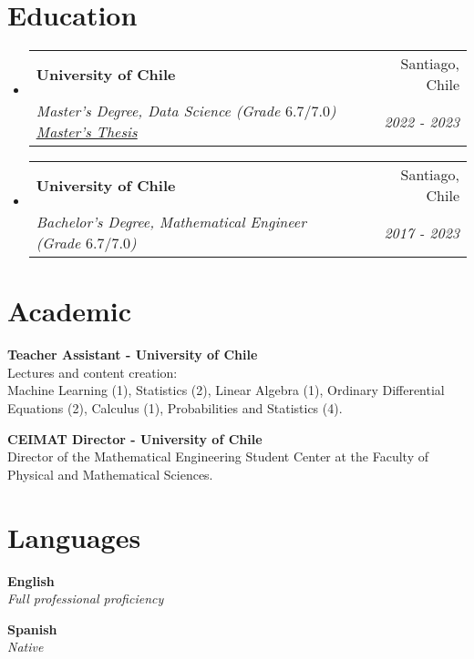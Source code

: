 \documentclass[letterpaper,11pt]{article}
\makeatletter
\newcommand{\resumeSubheading}[4]{
  \vspace{-2pt}\item
    \begin{tabular*}{0.97\textwidth}[t]{l@{\extracolsep{\fill}}r}
      \textbf{#1} & #2 \\
      \textit{\small#3} & \textit{\small #4} \\
    \end{tabular*}\vspace{-7pt}
}
\newcommand{\resumeSubHeadingListStart}{\begin{itemize}[leftmargin=0.15in, label={}]}
\newcommand{\resumeSubHeadingListEnd}{\end{itemize}}
\makeatother
\begin{document}
\section{Education}
  \resumeSubHeadingListStart
    \resumeSubheading
      {University of Chile}{Santiago, Chile}
      {Master's Degree, Data Science (Grade $6.7/7.0$) \href{https://repositorio.uchile.cl/handle/2250/197408}{\underline{Master's Thesis}}}{2022 - 2023}
    \resumeSubheading
      {University of Chile}{Santiago, Chile}
      {Bachelor's Degree, Mathematical Engineer (Grade $6.7/7.0$)}{2017 - 2023}
  \resumeSubHeadingListEnd


 \section{Academic}
  \begin{itemize}[leftmargin=0.15in, label={}]
  \small{\item{
     \textbf{Teacher Assistant - University of Chile} \\
     Lectures and content creation:\\ Machine Learning (1), Statistics (2), Linear Algebra (1), Ordinary Differential Equations (2), Calculus (1), Probabilities and Statistics (4). \\
    }}
    \small{\item{
     \textbf{CEIMAT Director - University of Chile} \\
     Director of the Mathematical Engineering Student Center at the Faculty of Physical and Mathematical Sciences. 
    }}
 \end{itemize}


\section{Languages}
  \begin{itemize}[leftmargin=0.15in, label={}]
    \small{\item{
     \textbf{English} \\
     \textit{Full professional proficiency} \\
    }}
    \small{\item{
     \textbf{Spanish} \\
     \textit{Native} \\
    }}
 \end{itemize}
\end{document}
